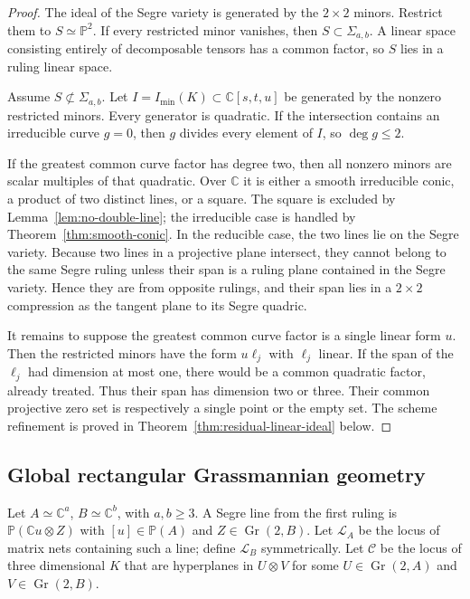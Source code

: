 \documentclass[11pt]{amsart}
\newcommand{\chg}[1]{#1}
\newcommand{\Gr}{\operatorname{Gr}}
\theoremstyle{plain}
\theoremstyle{definition}
\theoremstyle{remark}
\begin{document}
\begin{proof}
The ideal of the Segre variety is generated by the $2\times2$ minors. Restrict them to $S\simeq\mathbb P^2$. If every restricted minor vanishes, then $S\subset\Sigma_{a,b}$. A linear space consisting entirely of decomposable tensors has a common factor, so $S$ lies in a ruling linear space.

Assume $S\not\subset\Sigma_{a,b}$. Let ${I=I_{\min}(K)}\subset\mathbb C[s,t,u]$ be generated by the nonzero restricted minors. Every generator is quadratic. If the intersection contains an irreducible curve $g=0$, then $g$ divides every element of $I$, so $\deg g\le2$.

If the greatest common curve factor has degree two, then all nonzero minors are scalar multiples of that quadratic. Over $\mathbb C$ it is either a smooth irreducible conic, a product of two distinct lines, or a square. The square is excluded by Lemma~\ref{lem:no-double-line}; the irreducible case is handled by Theorem~\ref{thm:smooth-conic}. In the reducible case, the two lines lie on the Segre variety. Because two lines in a projective plane intersect, they cannot belong to the same Segre ruling unless their span is a ruling plane contained in the Segre variety. Hence they are from opposite rulings, and their span lies in a $2\times2$ compression as the tangent plane to its Segre quadric.

It remains to suppose the greatest common curve factor is a single linear form $u$. Then the restricted minors have the form $u\ell_j$ with $\ell_j$ linear. If the span of the $\ell_j$ had dimension at most one, there would be a common quadratic factor, already treated. Thus their span has dimension two or three. Their common projective zero set is respectively a single point or the empty set. The scheme refinement is proved in Theorem~\ref{thm:residual-linear-ideal} below.
\end{proof}

\subsection{Global rectangular Grassmannian geometry}

Let $A\simeq\mathbb C^a$, $B\simeq\mathbb C^b$, with $a,b\ge3$. A \chg{Segre line from the first ruling} is $\mathbb P(\mathbb Cu\otimes Z)$ with $[u]\in\mathbb P(A)$ and $Z\in\Gr(2,B)$. Let $\mathcal L_A$ be the locus of matrix nets containing such a line; define $\mathcal L_B$ symmetrically. Let $\mathcal C$ be the locus of \chg{three dimensional} $K$ that are hyperplanes in $U\otimes V$ for some $U\in\Gr(2,A)$ and $V\in\Gr(2,B)$.
\end{document}
